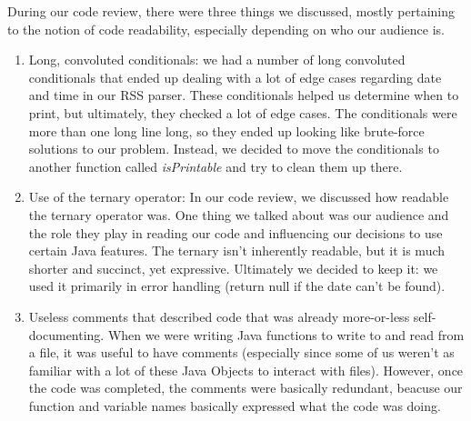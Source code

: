 \documentclass{article}
\begin{document}

During our code review, there were three things we discussed, mostly pertaining to the notion of code readability, especially depending on who our audience is.  

\begin{enumerate}
\item Long, convoluted conditionals: we had a number of long convoluted conditionals that ended up dealing with a lot of edge cases regarding date and time in our RSS parser.  These conditionals helped us determine when to print, but ultimately, they checked a lot of edge cases.  The conditionals were more than one long line long, so they ended up looking like brute-force solutions to our problem.  Instead, we decided to move the conditionals to another function called \emph{isPrintable} and try to clean them up there.
\item Use of the ternary operator: In our code review, we discussed how readable the ternary operator was.  One thing we talked about was our audience and the role they play in reading our code and influencing our decisions to use certain Java features.  The ternary isn't inherently readable, but it is much shorter and succinct, yet expressive.  Ultimately we decided to keep it: we used it primarily in error handling (return null if the date can't be found).  
\item Useless comments that described code that was already more-or-less self-documenting.  When we were writing Java functions to write to and read from a file, it was useful to have comments (especially since some of us weren't as familiar with a lot of these Java Objects to interact with files).  However, once the code was completed, the comments were basically redundant, beacuse our function and variable names basically expressed what the code was doing.

\end{enumerate}
\end{document}
